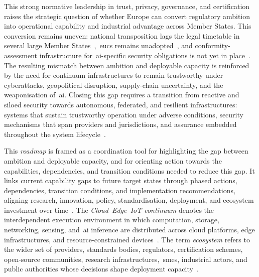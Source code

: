 \documentclass{ieeeaccess}
\begin{document}
This strong normative leadership in trust, privacy, governance, and certification~\cite{madiega2020,farrand2024} raises the strategic question of whether Europe can convert regulatory ambition into operational capability and industrial advantage across Member States. This conversion remains uneven: national transposition lags the legal timetable in several large Member States~\cite{ec2025nis2status},~\gls{eucs} remains unadopted~\cite{ec2025cloudsov}, and conformity-assessment infrastructure for~\gls{ai}-specific security obligations is not yet in place~\cite{ep2026aiact}. The resulting mismatch between ambition and deployable capacity is reinforced by the need for continuum infrastructures to remain trustworthy under cyberattacks, geopolitical disruption, supply-chain uncertainty, and the weaponisation of~\gls{ai}. Closing this gap requires a transition from reactive and siloed security towards autonomous, federated, and resilient infrastructures: systems that sustain trustworthy operation under adverse conditions, security mechanisms that span providers and jurisdictions, and assurance embedded throughout the system lifecycle~\cite{enisa2019iotsdlc,cavoukian2009,rose2020zta}.

This \emph{roadmap} is framed as a coordination tool for highlighting the gap between ambition and deployable capacity, and for orienting action towards the capabilities, dependencies, and transition conditions needed to reduce this gap. It links current capability gaps to future target states through phased actions, dependencies, transition conditions, and implementation recommendations, aligning research, innovation, policy, standardisation, deployment, and ecosystem investment over time~\cite{ecroadmap2024}. The \emph{Cloud--Edge--IoT continuum} denotes the interdependent execution environment in which computation, storage, networking, sensing, and~\gls{ai} inference are distributed across cloud platforms, edge infrastructures, and resource-constrained devices~\cite{dustdar2023,bittencourt2018,ecroadmap2024,etsimec003}. The term \emph{ecosystem} refers to the wider set of providers, standards bodies, regulators, certification schemes, open-source communities, research infrastructures,~\glspl{sme}, industrial actors, and public authorities whose decisions shape deployment capacity~\cite{ecroadmap2024,eucsa,commreg2024eucc}.
\end{document}
